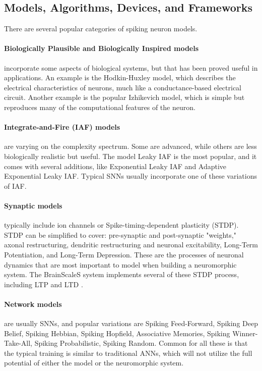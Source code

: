 \subsection{Models, Algorithms, Devices, and Frameworks}
There are several popular categories of spiking neuron models.

\paragraph{Biologically Plausible and Biologically Inspired models} incorporate some aspects of biological systems, but that has been proved useful in applications.
An example is the Hodkin-Huxley model, which describes the electrical characteristics of neurons, much like a conductance-based electrical circuit.
Another example is the popular Izhikevich model, which is simple but reproduces many of the computational features of the neuron.
\cite{schuman_survey_2017}

\paragraph{Integrate-and-Fire (IAF) models} are varying on the complexity spectrum. Some are advanced, while others are less biologically realistic but useful.
The model Leaky IAF is the most popular, and it comes with several additions, like Exponential Leaky IAF and Adaptive Exponential Leaky IAF. Typical SNNs usually incorporate one of these variations of IAF.
\cite{schuman_survey_2017}

\paragraph{Synaptic models} typically include ion channels or Spike-timing-dependent plasticity (STDP).
STDP can be simplified to cover: pre-synaptic and post-synaptic "weights," axonal restructuring, dendritic restructuring and neuronal excitability, Long-Term Potentiation, and Long-Term Depression.
These are the processes of neuronal dynamics that are most important to model when building a neuromorphic system.
The BrainScaleS system implements several of these STDP process, including LTP and LTD \cite{meier_mixed-signal_2015}\cite{schemmel_implementing_2006}.
\cite{schuman_survey_2017}

\paragraph{Network models} are usually SNNs, and popular variations are Spiking Feed-Forward, Spiking Deep Belief, Spiking Hebbian, Spiking Hopfield, Associative Memories, Spiking Winner-Take-All, Spiking Probabilistic, Spiking Random. Common for all these is that the typical training is similar to traditional ANNs, which will not utilize the full potential of either the model or the neuromorphic system.
\cite{schuman_survey_2017}

